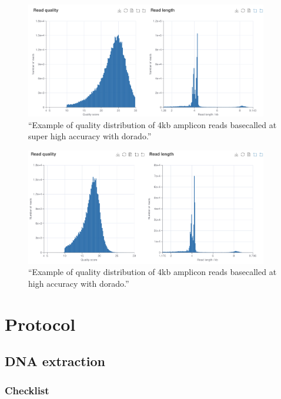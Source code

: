 \documentclass[
]{book}
\begin{document}
\begin{figure}
\centering
\includegraphics[width=4.16667in,height=\textheight]{./img/basecallsummary.png}
\caption{``Example of quality distribution of 4kb amplicon reads basecalled at super high accuracy with dorado.''}
\end{figure}

\begin{figure}
\centering
\includegraphics[width=4.16667in,height=\textheight]{./img/basecallsummaryHAC.png}
\caption{``Example of quality distribution of 4kb amplicon reads basecalled at high accuracy with dorado.''}
\end{figure}

\chapter{Protocol}\label{protocol}

\section{DNA extraction}\label{dna-extraction}

\subsection{Checklist}\label{checklist}
\end{document}

